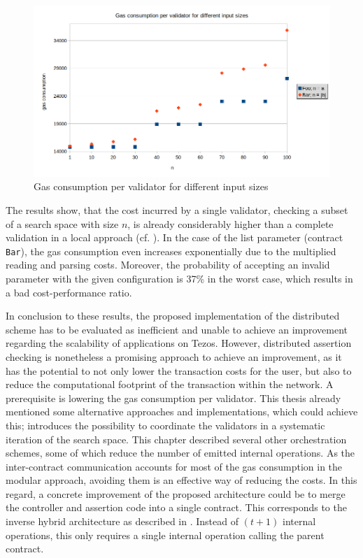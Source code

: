 \begin{figure}[t]
\centering
\includegraphics[width=0.9\linewidth]{figures/5-offline_tezos/cost_analysis}
\caption{Gas consumption per validator for different input sizes}
\label{fig:cost_distributed}
\end{figure}

The results show, that the cost incurred by a single validator, checking a subset of a search space with size $n$, is already considerably higher than a complete validation in a local approach (cf. ). In the case of the list parameter (contract \texttt{Bar}), the gas consumption even increases exponentially due to the multiplied reading and parsing costs. Moreover, the probability of accepting an invalid parameter with the given configuration is 37\% in the worst case, which results in a bad cost-performance ratio.

In conclusion to these results, the proposed implementation of the distributed scheme has to be evaluated as inefficient and unable to achieve an improvement regarding the scalability of applications on Tezos. However, distributed assertion checking is nonetheless a promising approach to achieve an improvement, as it has the potential to not only lower the transaction costs for the user, but also to reduce the computational footprint of the transaction within the network. A prerequisite is lowering the gas consumption per validator. This thesis already mentioned some alternative approaches and implementations, which could achieve this;  introduces the possibility to coordinate the validators in a systematic iteration of the search space. This chapter described several other orchestration schemes, some of which reduce the number of emitted internal operations. As the inter-contract communication accounts for most of the gas consumption in the modular approach, avoiding them is an effective way of reducing the costs. In this regard, a concrete improvement of the proposed architecture could be to merge the controller and assertion code into a single contract. This corresponds to the inverse hybrid architecture as described in . Instead of $(t+1)$ internal operations, this only requires a single internal operation calling the parent contract.

